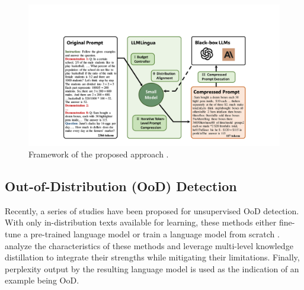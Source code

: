 \begin{figure}[htb]
    \centering
    \includegraphics[width=0.98\linewidth]{figures/framework_LLMlingua.pdf}
    \caption{Framework of the proposed approach \textit{\sysname{}}.}
    \label{fig:framework}
\end{figure}


\subsection{Out-of-Distribution (OoD) Detection}
Recently, a series of studies have been proposed for unsupervised OoD detection. %
With only in-distribution texts available for learning, these methods either fine-tune a pre-trained language model \cite{arora2021types} or train a language model from scratch \cite{mai2022self}.
\citet{wu2023multi} analyze the characteristics of these methods and leverage multi-level knowledge distillation to integrate their strengths while mitigating their limitations.
Finally, perplexity output by the resulting language model is used as the indication of an example being OoD.

